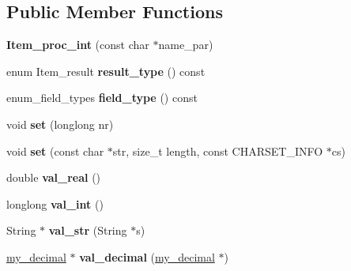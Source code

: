 \subsection*{Public Member Functions}
\begin{DoxyCompactItemize}
\item 
\mbox{\label{classItem__proc__int_a3786ab8147199983d06d142226f23e77}} 
{\bfseries Item\+\_\+proc\+\_\+int} (const char $\ast$name\+\_\+par)
\item 
\mbox{\label{classItem__proc__int_abb90233368fa333f6c971a8c3b4d0125}} 
enum Item\+\_\+result {\bfseries result\+\_\+type} () const
\item 
\mbox{\label{classItem__proc__int_a1ea556896d72dab73fc64c08bd233739}} 
enum\+\_\+field\+\_\+types {\bfseries field\+\_\+type} () const
\item 
\mbox{\label{classItem__proc__int_a871cd5097861cf4301e9e5d475e163db}} 
void {\bfseries set} (longlong nr)
\item 
\mbox{\label{classItem__proc__int_a03494437259620f46d35683c66b0a7e0}} 
void {\bfseries set} (const char $\ast$str, size\+\_\+t length, const C\+H\+A\+R\+S\+E\+T\+\_\+\+I\+N\+FO $\ast$cs)
\item 
\mbox{\label{classItem__proc__int_ae308ab45d2ed939702ee875f2cfbbfb1}} 
double {\bfseries val\+\_\+real} ()
\item 
\mbox{\label{classItem__proc__int_a187f375b478d4fdf2eb5786a2f03c31d}} 
longlong {\bfseries val\+\_\+int} ()
\item 
\mbox{\label{classItem__proc__int_aeee0fefee817907d896a76f2528f8277}} 
String $\ast$ {\bfseries val\+\_\+str} (String $\ast$s)
\item 
\mbox{\label{classItem__proc__int_aba3da419dc72de3347fd1933968456f4}} 
\mbox{\hyperlink{classmy__decimal}{my\+\_\+decimal}} $\ast$ {\bfseries val\+\_\+decimal} (\mbox{\hyperlink{classmy__decimal}{my\+\_\+decimal}} $\ast$)
\item 

\end{DoxyCompactItemize}
